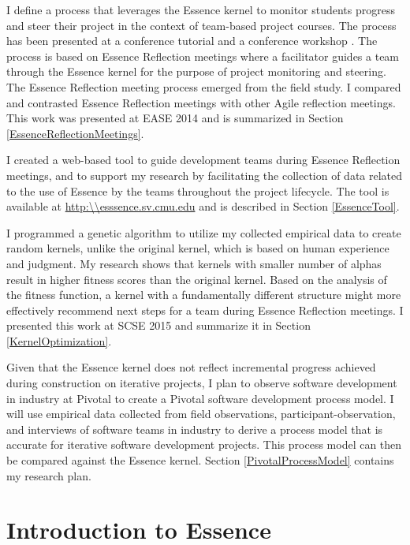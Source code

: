 \documentclass[preprint,12pt,3p]{elsarticle}
\begin{document}
I define a process that leverages the Essence kernel to monitor students progress and steer their project in the context of team-based project courses. The process has been presented at a conference tutorial \cite{SCSE2015Tutorial} and a conference workshop \cite{CSEET2015Workshop}. The process is based on Essence Reflection meetings where a facilitator guides a team through the Essence kernel for the purpose of project monitoring and steering. The Essence Reflection meeting process emerged from the field study. I compared and contrasted Essence Reflection meetings with other Agile reflection meetings. This work was presented at EASE 2014 \cite{EASE2014} and is summarized in Section \ref{EssenceReflectionMeetings}.

I created a web-based tool to guide development teams during Essence Reflection meetings, and to support my research by facilitating the collection of data related to the use of Essence by the teams throughout the project lifecycle. The tool is available at \url{http:\\esssence.sv.cmu.edu} and is described in Section \ref{EssenceTool}.

I programmed a genetic algorithm to utilize my collected empirical data to create random kernels, unlike the original kernel, which is based on human experience and judgment. My research shows that kernels with smaller number of alphas result in higher fitness scores than the original kernel. Based on the analysis of the fitness function, a kernel with a fundamentally different structure might more effectively recommend next steps for a team during Essence Reflection meetings. I presented this work at SCSE 2015 and summarize it in Section \ref{KernelOptimization}.

Given that the Essence kernel does not reflect incremental progress achieved during construction on iterative projects, I plan to observe software development in industry at Pivotal to create a Pivotal software development process model. I will use empirical data collected from field observations, participant-observation, and interviews of software teams in industry to derive a process model that is accurate for iterative software development projects. This process model can then be compared against the Essence kernel. Section \ref{PivotalProcessModel} contains my research plan.

\section{Introduction to Essence}
\label{Method}
\end{document}
